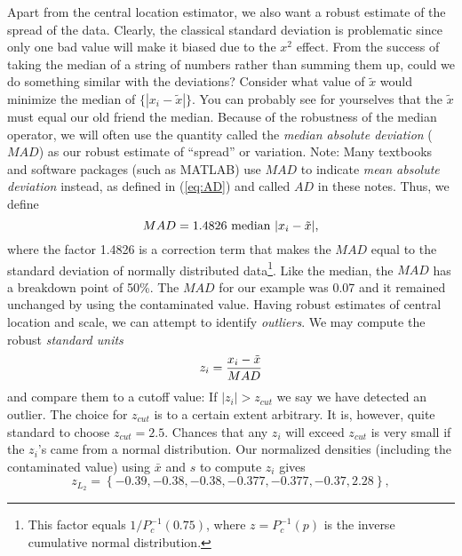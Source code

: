 	Apart from the central location estimator, we also want a robust estimate of the spread of the 
data.  Clearly, the classical standard deviation is problematic since only one bad value will make it 
biased due to the $x^2$  effect.  From the success of taking the median of a string of numbers rather 
than summing them up, could we do something similar with the deviations?  Consider what 
value of $\tilde{x}$ would minimize the median of $\{|x_i - \tilde{x}|\}$.
You can probably see for yourselves that the $\tilde{x}$ must equal 
our old friend the median.  Because of the robustness of the median operator, we will often use 
the quantity called the \emph{median absolute deviation} ($MAD$) as our robust estimate of ``spread'' or variation.
Note: Many textbooks and software packages (such as MATLAB) use $MAD$ to indicate \emph{mean absolute deviation}
instead, as defined in (\ref{eq:AD}) and called $AD$ in these notes.  Thus, we define
\begin{equation}
	\index{MAD}
	\index{Median absolute deviation}
MAD = 1.4826 \mbox{ median } |x_i - \tilde{x} |,
\end{equation}
where the factor 1.4826 is a correction term that makes the $MAD$ equal to the standard deviation 
of normally distributed data\footnote{This factor equals $1/P^{-1}_c(0.75)$, where $z = P^{-1}_c(p)$ is
the inverse cumulative normal distribution.}.  Like the median, the $MAD$ has a breakdown point of 50\%.  The $MAD$ 
for our  example was 0.07 and it remained unchanged by using the contaminated value.
	Having robust estimates of central location and scale, we can attempt to identify \emph{outliers}.  We may 
compute the robust \emph{standard units}
\begin{equation}
	\index{Normal scores!robust}
	\index{Standard scores!robust}
z_i = \frac{x_i - \tilde{x}} {MAD}
\end{equation}
and compare them to a cutoff value: If $|z_i| > z_{cut}$ we say we have detected an outlier.  The choice 
for $z_{cut}$ is to a certain extent arbitrary.  It is, however, quite standard to choose $z_{cut} = 2.5$.  Chances 
that any $z_i$ will exceed $z_{cut}$  is very small if the $z_i$'s came from a normal distribution.  Our 
normalized densities (including the contaminated value) using $\bar{x}$ and $s$ to compute $z_i$ gives 
\begin{equation}
z_{\scriptscriptstyle L_{\scriptscriptstyle 2}} = \left \{ -0.39, -0.38, -0.38, -0.377, -0.377, -0.37, 2.28\right \},
\end{equation}
